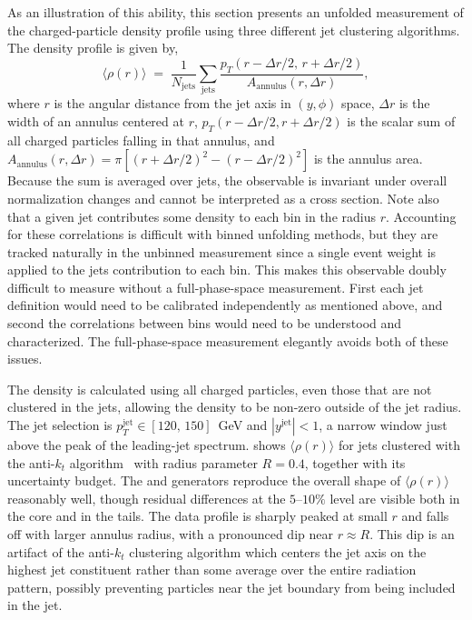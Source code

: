 As an illustration of this ability, this section presents an unfolded measurement of the charged-particle \pt density profile using three different jet clustering algorithms.
The \pt density profile is given by,
\begin{equation}
    \langle \rho(r) \rangle \;=\; \frac{1}{N_{\mathrm{jets}}} \sum_{\mathrm{jets}} \frac{p_T(r - \Delta r / 2,\, r + \Delta r / 2)}{A_{\mathrm{annulus}}(r, \Delta r)},
    \label{eqn:zjets-rho-r}
\end{equation}
where $r$ is the angular distance from the jet axis in $(y, \phi)$ space, $\Delta r$ is the width of an annulus centered at $r$, $p_T(r - \Delta r / 2, r + \Delta r / 2)$ is the scalar \pt sum of all charged particles falling in that annulus, and $A_{\mathrm{annulus}}(r, \Delta r) = \pi[(r + \Delta r / 2)^2 - (r - \Delta r / 2)^2]$ is the annulus area.
Because the sum is averaged over jets, the observable is invariant under overall normalization changes and cannot be interpreted as a cross section.
Note also that a given jet contributes some \pt density to each bin in the radius $r$.
Accounting for these correlations is difficult with binned unfolding methods, but they are tracked naturally in the unbinned \Omnifold measurement since a single event weight is applied to the jets contribution to each bin.
This makes this observable doubly difficult to measure without a full-phase-space measurement.
First each jet definition would need to be calibrated independently as mentioned above, and second the correlations between bins would need to be understood and characterized.
The full-phase-space measurement elegantly avoids both of these issues.

The \pt density is calculated using all charged particles, even those that are not clustered in the jets, allowing the density to be non-zero outside of the jet radius.
The jet selection is $p_T^{\mathrm{jet}} \in [120,\,150]$~GeV and $|y^{\mathrm{jet}}| < 1$, a narrow window just above the peak of the leading-jet \pt spectrum.
 shows $\langle \rho(r) \rangle$ for jets clustered with the anti-$k_t$ algorithm~\cite{Cacciari:2008gp} with radius parameter $R = 0.4$, together with its uncertainty budget.
The \mgpy and \sherpa generators reproduce the overall shape of $\langle \rho(r) \rangle$ reasonably well, though residual differences at the $5$--$10\%$ level are visible both in the core and in the tails.
The data profile is sharply peaked at small $r$ and falls off with larger annulus radius, with a pronounced dip near $r \approx R$.
This dip is an artifact of the anti-$k_t$ clustering algorithm which centers the jet axis on the highest \pt jet constituent rather than some average over the entire radiation pattern, possibly preventing particles near the jet boundary from being included in the jet.


